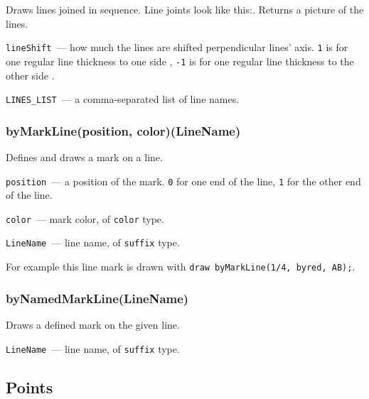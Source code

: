 	Draws lines joined in sequence. Line joints look like this:\drawCurrentPicture. Returns a picture of the lines.
	
	\texttt{lineShift}~— how much the lines are shifted perpendicular lines' axis. \texttt{1} is for one regular line thickness to one side%
	, 
	\texttt{-1} is for one regular line thickness to the other side%
	.
	
	\texttt{LINES\_LIST}~— a comma-separated list of line names.
	

\subsubsection{byMarkLine(position, color)(LineName)}\label{byMarkLine}

	
	Defines and draws a mark on a line.
	
	\texttt{position}~— a position of the mark. \texttt{0} for one end of the line, \texttt{1} for the other end of the line.
	
	\texttt{color}~— mark color, of \texttt{color} type.
	
	\texttt{LineName}~— line name, of \texttt{suffix} type.
	
	For example this line mark  is drawn with \texttt{draw byMarkLine(1/4, byred, AB);}.

\subsubsection{byNamedMarkLine(LineName)}

	Draws a defined mark on the given line.
	
	\texttt{LineName}~— line name, of \texttt{suffix} type.
	

\subsection{Points}

